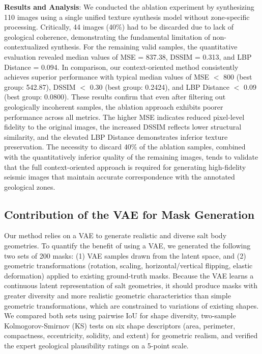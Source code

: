 \documentclass{ieeeaccess}
\begin{document}
\textbf{Results and Analysis}: We conducted the ablation experiment by synthesizing 110 images using a single unified texture synthesis model without zone-specific processing. Critically, 44 images (40\%) had to be discarded due to lack of geological coherence, demonstrating the fundamental limitation of non-contextualized synthesis. For the remaining valid samples, the quantitative evaluation revealed median values of MSE = 837.38, DSSIM = 0.313, and LBP Distance = 0.094. In comparison, our context-oriented method consistently achieves superior performance with typical median values of MSE $<$ 800 (best group: 542.87), DSSIM $<$ 0.30 (best group: 0.2424), and LBP Distance $<$ 0.09 (best group: 0.0800). These results confirm that even after filtering out geologically incoherent samples, the ablation approach exhibits poorer performance across all metrics. The higher MSE indicates reduced pixel-level fidelity to the original images, the increased DSSIM reflects lower structural similarity, and the elevated LBP Distance demonstrates inferior texture preservation. The necessity to discard 40\% of the ablation samples, combined with the quantitatively inferior quality of the remaining images, tends to validate that the full context-oriented approach is required for generating high-fidelity seismic images that maintain accurate correspondence with the annotated geological zones.

\subsection{Contribution of the VAE for Mask Generation}

Our method relies on a VAE to generate realistic and diverse salt body geometries. To quantify the benefit of using a VAE, we generated the following two sets of 200 masks: (1) VAE samples drawn from the latent space, and (2) geometric transformations (rotation, scaling, horizontal/vertical flipping, elastic deformation) applied to existing ground-truth masks. Because the VAE learns a continuous latent representation of salt geometries, it should produce masks with greater diversity and more realistic geometric characteristics than simple geometric transformations, which are constrained to variations of existing shapes. We compared both sets using pairwise IoU for shape diversity, two-sample Kolmogorov-Smirnov (KS) tests on six shape descriptors (area, perimeter, compactness, eccentricity, solidity, and extent) for geometric realism, and verified the expert geological plausibility ratings on a 5-point scale.
\end{document}
